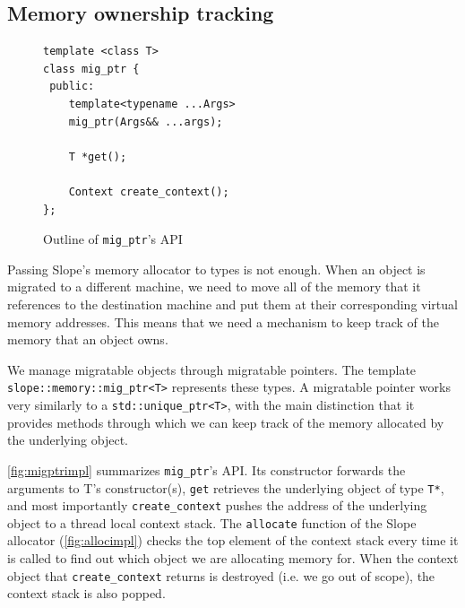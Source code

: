 \subsection{Memory ownership tracking}
\label{sec:ownershiptracking}

\begin{figure}[tp]
\begin{lstlisting}
template <class T>
class mig_ptr {
 public:
    template<typename ...Args>
    mig_ptr(Args&& ...args);

    T *get();

    Context create_context();
};
\end{lstlisting}
    \caption{ Outline of \texttt{mig\_ptr}'s API }
\label{fig:migptrimpl}
\end{figure}


Passing Slope's memory allocator to types is not enough.
When an object is migrated to a different machine, we need to move all of the
memory that it references to the destination machine and put them at their
corresponding virtual memory addresses. This means
that we need a mechanism to keep track of the memory that an object owns.


We manage migratable objects through migratable pointers. The template\\
\texttt{slope::memory::mig\_ptr<T>} represents these types. A migratable
pointer works very similarly to a \texttt{std::unique\_ptr<T>}, with the
main distinction that it provides methods through which we can keep track
of the memory allocated by the underlying object.


\autoref{fig:migptrimpl} summarizes \texttt{mig\_ptr}'s API. Its
constructor forwards the arguments to
T's constructor(s), \texttt{get} retrieves the underlying object of
type \texttt{T*}, and most importantly \texttt{create\_context}
pushes the address of the underlying object to a thread local context stack.
The \texttt{allocate} function of the Slope allocator (\autoref{fig:allocimpl})
checks the top element of the context stack every time it is called to find out
which object we are allocating memory for. When the context object that
\texttt{create\_context} returns is destroyed (i.e. we go out of scope), the
context stack is also popped.


